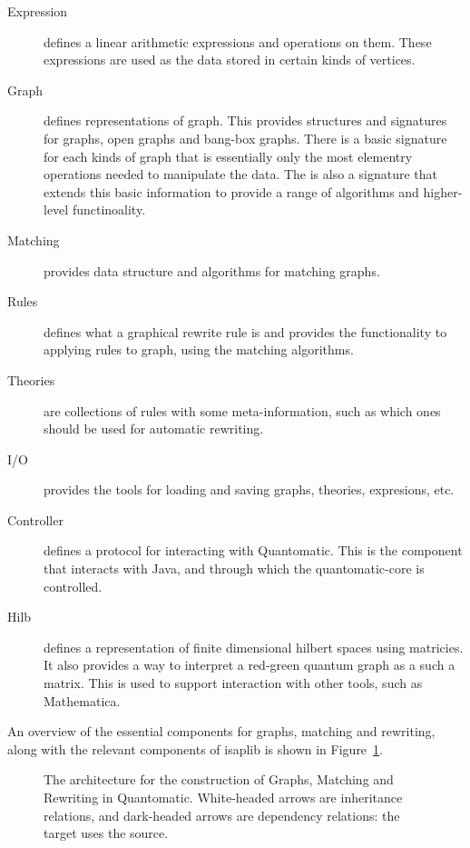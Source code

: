 \documentclass{article}
\begin{document}
\begin{description}
\item[Expression] defines a linear arithmetic expressions and
  operations on them. These expressions are used as the data stored in
  certain kinds of vertices.
\item[Graph] defines representations of graph. This provides
  structures and signatures for graphs, open graphs and bang-box
  graphs. There is a basic signature for each kinds of graph that is
  essentially only the most elementry operations needed to manipulate
  the data. The is also a signature that extends this basic
  information to provide a range of algorithms and higher-level
  functinoality.
\item[Matching] provides data structure and algorithms for matching
  graphs.
\item[Rules] defines what a graphical rewrite rule is and provides
  the functionality to applying rules to graph, using the matching
  algorithms. 
\item[Theories] are collections of rules with some meta-information,
  such as which ones should be used for automatic rewriting.
\item[I/O] provides the tools for loading and saving graphs, theories,
  expresions, etc. 
\item[Controller] defines a protocol for interacting with
  Quantomatic. This is the component that interacts with Java, and
  through which the quantomatic-core is controlled.
\item[Hilb] defines a representation of finite dimensional hilbert
  spaces using matricies. It also provides a way to interpret a
  red-green quantum graph as a such a matrix. This is used to support
  interaction with other tools, such as Mathematica.
\end{description}

An overview of the essential components for graphs, matching and
rewriting, along with the relevant components of isaplib is shown in
Figure~\ref{fig:arch-overview-in-core}.

\begin{figure}[p]
\caption{The architecture for the construction of Graphs, Matching and
  Rewriting in Quantomatic. White-headed arrows are inheritance
  relations, and dark-headed arrows are dependency relations: the
  target uses the source.}
\label{fig:arch-overview-in-core}
\end{figure}
\end{document}
